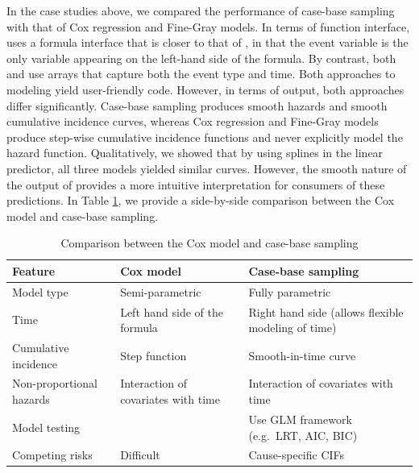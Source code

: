 \documentclass[
]{jss}
\begin{document}
In the case studies above, we compared the performance of case-base
sampling with that of Cox regression and Fine-Gray models. In terms of
function interface,  uses a formula interface that is
closer to that of , in that the event variable is the only
variable appearing on the left-hand side of the formula. By contrast,
both  and  use arrays
that capture both the event type and time. Both approaches to modeling
yield user-friendly code. However, in terms of output, both approaches
differ significantly. Case-base sampling produces smooth hazards and
smooth cumulative incidence curves, whereas Cox regression and Fine-Gray
models produce step-wise cumulative incidence functions and never
explicitly model the hazard function. Qualitatively, we showed that by
using splines in the linear predictor, all three models yielded similar
curves. However, the smooth nature of the output of 
provides a more intuitive interpretation for consumers of these
predictions. In Table \ref{tab:compCBvsCox}, we provide a side-by-side
comparison between the Cox model and case-base sampling.

\begin{table}
\caption{\label{tab:compCBvsCox}Comparison between the Cox model and case-base sampling}
\centering
\begin{tabular}[t]{llp{5cm}}
\toprule
Feature & Cox model & Case-base sampling\\
\midrule
Model type & Semi-parametric & Fully parametric\\
Time & Left hand side of the formula & Right hand side (allows flexible modeling of time)\\
Cumulative incidence & Step function & Smooth-in-time curve\\
Non-proportional hazards & Interaction of covariates with time & Interaction of covariates with time\\
Model testing &  & Use GLM framework \newline (e.g.\ LRT, AIC, BIC)\\
\addlinespace
Competing risks & Difficult & Cause-specific CIFs\\
\bottomrule
\end{tabular}
\end{table}
\end{document}
